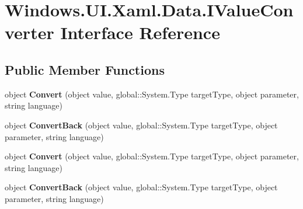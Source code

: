 \hypertarget{interface_windows_1_1_u_i_1_1_xaml_1_1_data_1_1_i_value_converter}{}\section{Windows.\+U\+I.\+Xaml.\+Data.\+I\+Value\+Converter Interface Reference}
\label{interface_windows_1_1_u_i_1_1_xaml_1_1_data_1_1_i_value_converter}
\subsection*{Public Member Functions}
\begin{DoxyCompactItemize}
\item 
\mbox{\label{interface_windows_1_1_u_i_1_1_xaml_1_1_data_1_1_i_value_converter_a42901db87e09f3c27528559240db2484}} 
object {\bfseries Convert} (object value, global\+::\+System.\+Type target\+Type, object parameter, string language)
\item 
\mbox{\label{interface_windows_1_1_u_i_1_1_xaml_1_1_data_1_1_i_value_converter_a34ff4ba1eae0486d624de1022902df8a}} 
object {\bfseries Convert\+Back} (object value, global\+::\+System.\+Type target\+Type, object parameter, string language)
\item 
\mbox{\label{interface_windows_1_1_u_i_1_1_xaml_1_1_data_1_1_i_value_converter_a42901db87e09f3c27528559240db2484}} 
object {\bfseries Convert} (object value, global\+::\+System.\+Type target\+Type, object parameter, string language)
\item 
\mbox{\label{interface_windows_1_1_u_i_1_1_xaml_1_1_data_1_1_i_value_converter_a34ff4ba1eae0486d624de1022902df8a}} 
object {\bfseries Convert\+Back} (object value, global\+::\+System.\+Type target\+Type, object parameter, string language)
\item 
\mbox{\label{interface_windows_1_1_u_i_1_1_xaml_1_1_data_1_1_i_value_converter_a42901db87e09f3c27528559240db2484}} 

\end{DoxyCompactItemize}
